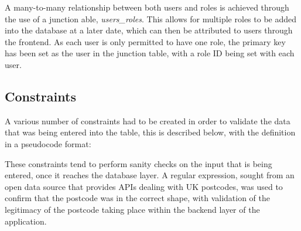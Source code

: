 A many-to-many relationship between both users and roles is achieved through the use of a junction able, \textit{users\_roles}. This allows for multiple roles to be added into the database at a later date, which can then be attributed to users through the frontend. As each user is only permitted to have one role, the primary key has been set as the user in the junction table, with a role ID being set with each user.

\subsection{Constraints}

A various number of constraints had to be created in order to validate the data that was being entered into the table, this is described below, with the definition in a pseudocode format:

\begin{table}[h]
\centering
{}
\caption{A list of constraints in the points\_of\_interest relation}
\label{poi_constraints}
\end{table}

These constraints tend to perform sanity checks on the input that is being entered, once it reaches the database layer. A regular expression, sought from an open data source that provides APIs dealing with UK postcodes\cite{PostcodeRegex}, was used to confirm that the postcode was in the correct shape, with validation of the legitimacy of the postcode taking place within the backend layer of the application.



